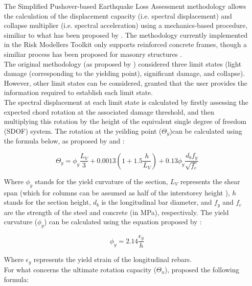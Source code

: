 The Simplified Pushover-based Earthquake Loss Assessment methodology \citep{BorziEtAl2008b} allows the calculation of the displacement capacity (i.e. spectral displacement) and collapse multiplier (i.e. spectral acceleration) using a mechanics-based procedure, similiar to what has been proposed by \cite{CosenzaEtAl2005}. The methodology currently implemented in the Risk Modellers Toolkit only supports reinforced concrete frames, though a similiar process has been proposed for masonry structures \citep{BorziEtAl2008a}.\\

The original methodology (as proposed by \cite{BorziEtAl2008b}) considered three limit states (light damage (corresponding to the yielding point), significant damage, and collapse). However, other limit states can be considered, granted that the user provides the information required to establish each limit state.\\

The spectral displacement at each limit state is calculated by firstly assessing the expected chord rotation at the associated damage threshold, and then multiplying this rotation by the height of the equivalent single degree of freedom (SDOF) system. The rotation at the yeilding point ($\Theta_y$)can be calculated using the formula below, as proposed by \cite{CosenzaEtAl2005} and \cite{PanagiotakosFardis2001}:

\begin{equation}
\Theta_y = \phi_y\frac{L_V}{3}+0.0013\left(1 + 1.5\frac{h}{L_V}\right)+0.13\phi_y\frac{d_bf_y}{\sqrt{f_c}}
\end{equation}

Where $\phi_y$ stands for the yield curvature of the section, $L_V$ represents the shear span (which for columns can be assumed as half of the interstorey height \citep{BorziEtAl2008b}), $h$ stands for the section height, $d_b$ is the longitudinal bar diameter, and $f_y$ and $f_c$ are the strength of the steel and concrete (in MPa), respectivaly. The yield curvature ($\phi_y$) can be calculated using the equation proposed by \cite{PriestleyEtAl2007}:

\begin{equation}
\phi_y = 2.14\frac{\epsilon_y}{h}
\end{equation}

Where $\epsilon_y$ represents the yield strain of the longitudinal rebars.\\

For what concerns the ultimate rotation capacity ($\Theta_u$), \cite{PanagiotakosFardis2001} proposed the following formula:

